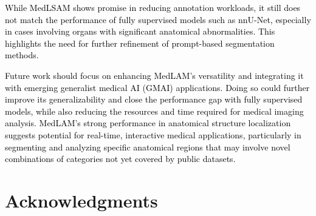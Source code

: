\documentclass[times,twocolumn,final]{elsarticle}
\begin{document}
\par \textcolor{black}{While MedLSAM shows promise in reducing annotation workloads, it still does not match the performance of fully supervised models such as nnU-Net, especially in cases involving organs with significant anatomical abnormalities. This highlights the need for further refinement of prompt-based segmentation methods.}

\par \textcolor{black}{Future work should focus on enhancing MedLAM’s versatility and integrating it with emerging generalist medical AI (GMAI)\cite{moor2023foundation} applications. Doing so could further improve its generalizability and close the performance gap with fully supervised models, while also reducing the resources and time required for medical imaging analysis. MedLAM's strong performance in anatomical structure localization suggests potential for real-time, interactive medical applications, particularly in segmenting and analyzing specific anatomical regions that may involve novel combinations of categories not yet covered by public datasets.}

\section*{Acknowledgments}



\end{document}

